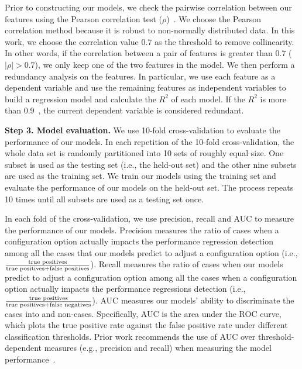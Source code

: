 Prior to constructing our models, we check the pairwise correlation between our features using the Pearson correlation test (\(\rho\))~\cite{benesty2009pearson}. We choose the Pearson correlation method because it is robust to non-normally distributed data. In this work, we choose the correlation value $0.7$ as the threshold to remove collinearity. In other words, if the correlation between a pair of features is greater than 0.7 (\(|\rho|>0.7\)), we only keep one of the two features in the model.
We then perform a redundancy analysis on the features. In particular, we use each feature as a dependent variable and use the remaining features as independent variables to build a regression model and calculate the $R^2$ of each model. If the $R^2$ is more than 0.9~\cite{markASE}, the current dependent variable is considered redundant. 

\noindent\textbf{Step 3. Model evaluation.}
We use 10-fold cross-validation to evaluate the performance of our models. %
In each repetition of the 10-fold cross-validation, the whole data set is randomly partitioned into 10 sets of roughly equal size. One subset is used as the testing set (i.e., the held-out set) and the other nine subsets are used as the training set. 
We train our models using the training set and evaluate the performance of our models on the held-out set.
The process repeats 10 times until all subsets are used as a testing set once.

In each fold of the cross-validation, we use precision, recall and 
AUC to measure the performance of our models.
Precision measures the ratio of cases when a configuration option actually impacts the performance regression detection among all the cases that our models predict to adjust a configuration option (i.e., $\frac{\textnormal{true positives}}{\textnormal{true positives} + \textnormal{false positives}}$). Recall measures the ratio of cases when our models predict to adjust a configuration option among all the cases when a configuration option actually impacts the performance regressions detection (i.e., $\frac{\textnormal{true positives}}{\textnormal{true positives} + \textnormal{false negatives}}$). 
AUC measures our models' ability to discriminate the \instance cases into \inconsistent and non-\inconsistent cases. Specifically, AUC is the area under the ROC curve, which plots the true positive rate against the false positive rate under different classification thresholds. 
Prior work recommends the use of AUC over threshold-dependent measures (e.g., precision and recall) when measuring the model performance~\cite{tantithamthavorn18experience}.

